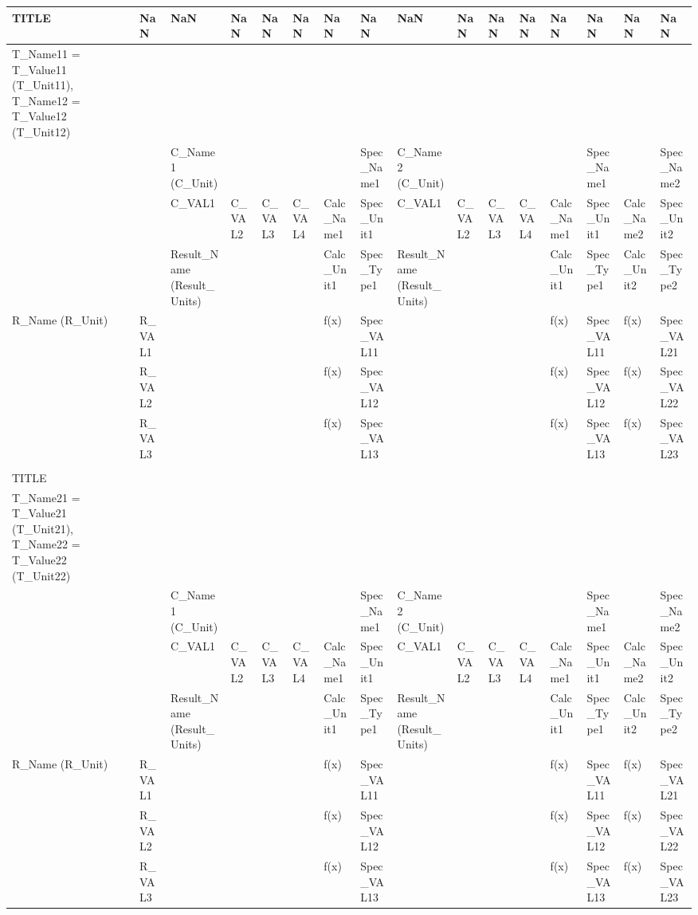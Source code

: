 \begin{tabular}{|l|l|l|l|l|l|l|l|l|l|l|l|l|l|l|l|}
\toprule
TITLE & NaN & NaN & NaN & NaN & NaN & NaN & NaN & NaN & NaN & NaN & NaN & NaN & NaN & NaN & NaN \\
\midrule
T_Name11 = T_Value11 (T_Unit11), T_Name12 = T_Value12 (T_Unit12) &  &  &  &  &  &  &  &  &  &  &  &  &  &  &  \\
 &  & C_Name1 (C_Unit) &  &  &  &  & Spec_Name1 & C_Name2 (C_Unit) &  &  &  &  & Spec_Name1 &  & Spec_Name2 \\
 &  & C_VAL1 & C_VAL2 & C_VAL3 & C_VAL4 & Calc_Name1 & Spec_Unit1 & C_VAL1 & C_VAL2 & C_VAL3 & C_VAL4 & Calc_Name1 & Spec_Unit1 & Calc_Name2 & Spec_Unit2 \\
 &  & Result_Name (Result_Units) &  &  &  & Calc_Unit1 & Spec_Type1 & Result_Name (Result_Units) &  &  &  & Calc_Unit1 & Spec_Type1 & Calc_Unit2 & Spec_Type2 \\
R_Name
(R_Unit) & R_VAL1 &  &  &  &  & f(x) & Spec_VAL11 &  &  &  &  & f(x) & Spec_VAL11 & f(x) & Spec_VAL21 \\
 & R_VAL2 &  &  &  &  & f(x) & Spec_VAL12 &  &  &  &  & f(x) & Spec_VAL12 & f(x) & Spec_VAL22 \\
 & R_VAL3 &  &  &  &  & f(x) & Spec_VAL13 &  &  &  &  & f(x) & Spec_VAL13 & f(x) & Spec_VAL23 \\
 &  &  &  &  &  &  &  &  &  &  &  &  &  &  &  \\
TITLE &  &  &  &  &  &  &  &  &  &  &  &  &  &  &  \\
T_Name21 = T_Value21 (T_Unit21), T_Name22 = T_Value22 (T_Unit22) &  &  &  &  &  &  &  &  &  &  &  &  &  &  &  \\
 &  & C_Name1 (C_Unit) &  &  &  &  & Spec_Name1 & C_Name2 (C_Unit) &  &  &  &  & Spec_Name1 &  & Spec_Name2 \\
 &  & C_VAL1 & C_VAL2 & C_VAL3 & C_VAL4 & Calc_Name1 & Spec_Unit1 & C_VAL1 & C_VAL2 & C_VAL3 & C_VAL4 & Calc_Name1 & Spec_Unit1 & Calc_Name2 & Spec_Unit2 \\
 &  & Result_Name (Result_Units) &  &  &  & Calc_Unit1 & Spec_Type1 & Result_Name (Result_Units) &  &  &  & Calc_Unit1 & Spec_Type1 & Calc_Unit2 & Spec_Type2 \\
R_Name
(R_Unit) & R_VAL1 &  &  &  &  & f(x) & Spec_VAL11 &  &  &  &  & f(x) & Spec_VAL11 & f(x) & Spec_VAL21 \\
 & R_VAL2 &  &  &  &  & f(x) & Spec_VAL12 &  &  &  &  & f(x) & Spec_VAL12 & f(x) & Spec_VAL22 \\
 & R_VAL3 &  &  &  &  & f(x) & Spec_VAL13 &  &  &  &  & f(x) & Spec_VAL13 & f(x) & Spec_VAL23 \\
\bottomrule
\end{tabular}
